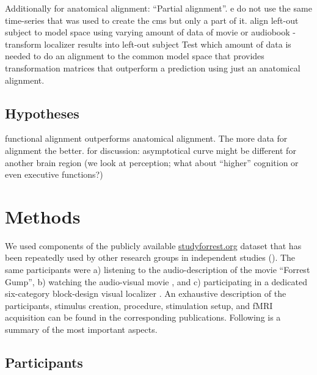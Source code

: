 {%
Additionally for anatomical alignment: ``Partial alignment''.
%
e do not use the same time-series that was used to
create the \ac{cms} but only a part of it.
%
align left-out subject to model space using varying amount of data of
movie or audiobook - transform localizer results into left-out subject
%
Test which amount of data is needed to do an alignment to the common
model space that provides transformation matrices that outperform a prediction
using just an anatomical alignment.

%


\subsection{Hypotheses}
%
functional alignment outperforms anatomical alignment.
%
The more data for alignment the better.
%
for discussion: asymptotical curve might be different for another brain region
(we look at perception; what about ``higher'' cognition or even executive
functions?)


\section{Methods}


We used components of the publicly available
\href{http://www.studyforrest.org}{studyforrest.org} dataset that has
been repeatedly used by other research groups in independent studies
(\citep[e.g.,][]{ben2018hippocampal, jiahui2020predicting, hu2017decoding,
lettieri2019emotionotopy, nguyen2016integration}).
The same participants were
a) listening to the audio-description \citep{hanke2014audiomovie} of
the movie ``Forrest Gump'',
b) watching the audio-visual movie \citep{hanke2016simultaneous}, and
c) participating in a dedicated six-category block-design visual localizer
\citep{sengupta2016extension}.
An exhaustive description of the participants, stimulus creation, procedure,
stimulation setup, and fMRI acquisition can be found in the corresponding
publications. Following is a summary of the most important aspects.


\subsection{Participants}

}

